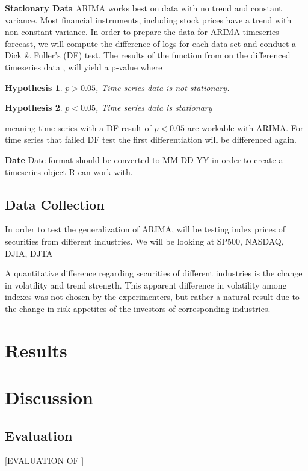 \documentclass{article}[12pt]
\newtheorem*{hyp*}{Hypothesis \protect\hypnumber} %
\newenvironment{hyp}[1]{\renewcommand{\hypnumber}{#1}\begin{hyp*}}{\end{hyp*}}
\newcommand{\hypnumber}{}
\begin{document}
                \textbf{Stationary Data} ARIMA works best on data with no trend and constant variance. Most financial instruments, including stock prices have a trend with non-constant variance. In order to prepare the data for ARIMA timeseries forecast, we will compute the difference of logs for each data set and conduct a Dick \& Fuller's (DF) test. The  results of the function  from  on the differenced timeseries data , will yield a p-value where 
                \begin{hyp}{0} 
                    $p>0.05$, Time series data is not stationary.
                \end{hyp}
                \begin{hyp}{1} 
                    $p<0.05$, Time series data is stationary
                \end{hyp}
                meaning time series with a DF result of $p<0.05$ are workable with ARIMA. For time series that failed DF test the first differentiation will be differenced again.

                \textbf{Date} Date format should be converted to MM-DD-YY in order to create a timeseries object R can work with.

            \subsection{Data Collection}
                In order to test the generalization of ARIMA, will be testing index prices of securities from different industries. We will be looking at SP500, NASDAQ, DJIA, DJTA 
                
                A quantitative difference regarding securities of different industries is the change in volatility and trend strength. This apparent difference in volatility among indexes was not chosen by the experimenters, but rather a natural result due to the change in risk appetites of the investors of corresponding industries.

        \section{Results}


        \section{Discussion}
            \subsection{Evaluation}
            [EVALUATION OF ]
                
\end{document}
